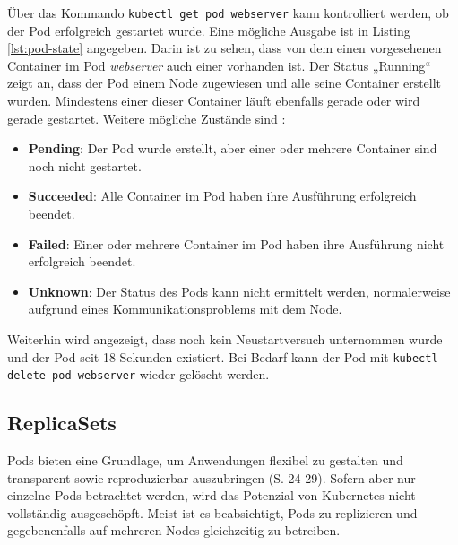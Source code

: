 \documentclass[11pt,a4paper]{article}
\begin{document}
Über das Kommando \lstinline|kubectl get pod webserver| kann kontrolliert werden,
ob der Pod erfolgreich gestartet wurde. Eine mögliche Ausgabe ist in
Listing \ref{lst:pod-state} angegeben. Darin ist zu sehen, dass
von dem einen vorgesehenen Container im Pod \emph{webserver} auch einer vorhanden ist.
Der Status „Running“ zeigt an, dass der Pod einem Node zugewiesen und alle seine Container erstellt wurden.
Mindestens einer dieser Container läuft ebenfalls gerade oder wird gerade gestartet.
Weitere mögliche Zustände sind \cite{kubernetes.io_pod_lifecycle}:
\begin{itemize}
  \item \textbf{Pending}: Der Pod wurde erstellt, aber einer oder mehrere Container sind noch nicht gestartet.
  \item \textbf{Succeeded}: Alle Container im Pod haben ihre Ausführung erfolgreich beendet.
  \item \textbf{Failed}: Einer oder mehrere Container im Pod haben ihre Ausführung nicht erfolgreich beendet.
  \item \textbf{Unknown}: Der Status des Pods kann nicht ermittelt werden, normalerweise aufgrund eines Kommunikationsproblems mit dem Node.
\end{itemize}
Weiterhin wird angezeigt, dass noch kein Neustartversuch unternommen wurde
und der Pod seit 18 Sekunden existiert.
Bei Bedarf kann der Pod mit \lstinline|kubectl delete pod webserver| wieder gelöscht werden.


\subsection{ReplicaSets}
Pods bieten eine Grundlage, um Anwendungen flexibel zu gestalten und
transparent sowie reproduzierbar auszubringen \cite{Schmeling_Dargatz_2022} (S. 24-29).
Sofern aber nur einzelne Pods betrachtet werden, wird das Potenzial von Kubernetes
nicht vollständig ausgeschöpft.
Meist ist es beabsichtigt, Pods zu replizieren und gegebenenfalls
auf mehreren Nodes gleichzeitig zu betreiben.
\end{document}
